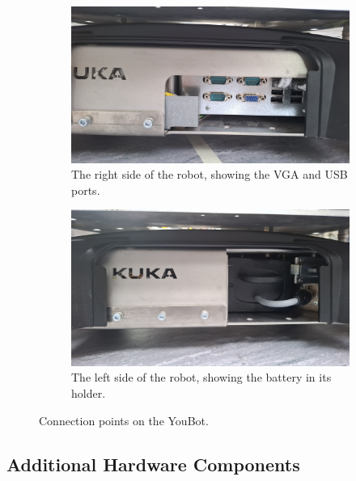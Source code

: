 \documentclass[a4paper, 12pt]{article}
\begin{document}
\begin{figure}[ht]
        \begin{subfigure}[t]{0.49\linewidth}
            \centering
            \includegraphics[width=\linewidth]{images/sec2/youbot_usb_ports.jpg}
            \caption{The right side of the robot, showing the VGA and USB ports.}
        \end{subfigure}
        \hfill
        \begin{subfigure}[t]{0.49\linewidth}
            \centering
            \includegraphics[width=\linewidth]{images/sec2/youbot_battery_holder.jpg}
            \caption{The left side of the robot, showing the battery in its holder.}
        \end{subfigure}

        \caption{Connection points on the YouBot.}
        \label{fig:youbot-quad}
    \end{figure}


    \subsection{Additional Hardware Components}
\end{document}
